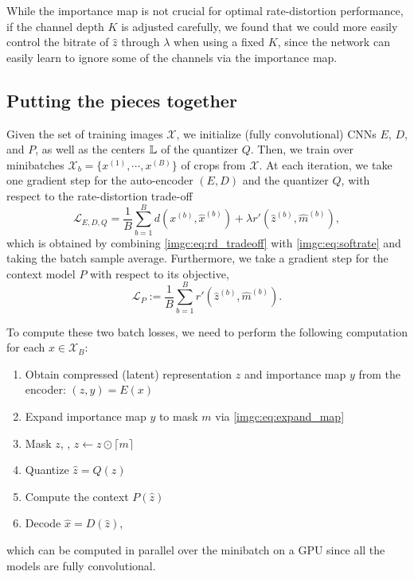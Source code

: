 While the importance map is not crucial for optimal rate-distortion performance, if the channel depth $K$ is adjusted carefully, we found that we could more easily control the bitrate of $\hat z$ through $\lambda$ when using a fixed $K$, since the network can easily learn to ignore some of the channels via the importance map.  

\subsection{Putting the pieces together}

Given the set of training images $\mathcal{X}$, we initialize (fully convolutional) CNNs $E$, $D$, and $P$, as well as the centers $\mathbb{L}$ of the quantizer $Q$. 
Then, we train over minibatches $\mathcal{X}_b=\{x^{(1)},\cdots,x^{(B)}\}$ of crops from $\mathcal{X}$.
At each iteration, we take one gradient step for the auto-encoder $(E,D)$ and the quantizer $Q$, with respect to the rate-distortion trade-off
\begin{equation}
    \mathcal L_{E,D,Q} = \frac{1}{B}\sum_{b=1}^B d(x^{(b)},\hat x^{(b)})+\lambda r'(\hat z^{(b)}, \hat m^{(b)}),\label{imgc:eq:rd_loss}
\end{equation}
which is obtained by combining \eqref{imgc:eq:rd_tradeoff} with  \eqref{imgc:eq:softrate} and taking the batch sample average.
Furthermore, we take a gradient step for the context model $P$ with respect to its objective,
\begin{equation}
\mathcal L_P := \frac{1}{B} \sum_{b=1}^B r'(\hat z^{(b)}, \hat m^{(b)}).
\end{equation}

To compute these two batch losses, we need to perform the following computation for each  $x\in\mathcal{X}_B$:
\begin{enumerate}
\setlength\itemsep{0.1em}
\item Obtain compressed (latent) representation $z$ and importance map $y$ from the encoder: $(z,y) = E(x)$
\item Expand importance map $y$ to mask $m$ via \eqref{imgc:eq:expand_map}
\item Mask $z$, \ie, $z\leftarrow z \odot \lceil m \rceil$
\item Quantize $\hat z=Q(z)$
\item Compute the context $P(\hat z)$
\item Decode $\hat x=D(\hat z)$,
\end{enumerate}
which can be computed in parallel over the minibatch on a GPU since all the models are fully convolutional.


